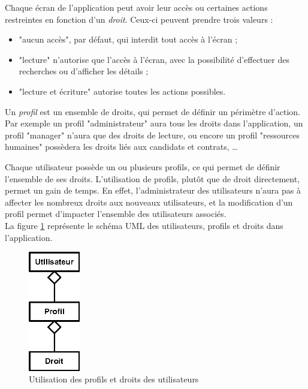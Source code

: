 Chaque écran de l'application peut avoir leur accès ou certaines actions restreintes en fonction d'un \textit{droit}.
Ceux-ci peuvent prendre trois valeurs : 
\begin{itemize}
	\item "aucun accès", par défaut, qui interdit tout accès à l'écran ;
	\item "lecture" n'autorise que l'accès à l'écran, avec la possibilité d'effectuer des recherches ou d'afficher les détails ;
	\item "lecture et écriture" autorise toutes les actions possibles.
\end{itemize}

Un \textit{profil} est un ensemble de droits, qui permet de définir un périmètre d'action.
Par exemple un profil "administrateur" aura tous les droits dans l'application, un profil "manager" n'aura que des droits de lecture, ou encore un profil "ressources humaines" possèdera les droits liés aux candidats et contrats, \ldots

Chaque utilisateur possède un ou plusieurs profils, ce qui permet de définir l'ensemble de ses droits.
L'utilisation de profils, plutôt que de droit directement, permet un gain de temps.
En effet, l'administrateur des utilisateurs n'aura pas à affecter les nombreux droits aux nouveaux utilisateurs, et la modification d'un profil permet d'impacter l'ensemble des utilisateurs associés.
\\

La figure \ref{utilisateur_profils_droits} représente le schéma UML des utilisateurs, profils et droits dans l'application.
\begin{figure}[!h]
	\center
	\includegraphics[width=0.2\textwidth]{img/utilisateur_profils_droits.png}
	\caption{Utilisation des profils et droits des utilisateurs}
	\label{utilisateur_profils_droits}
\end{figure}


